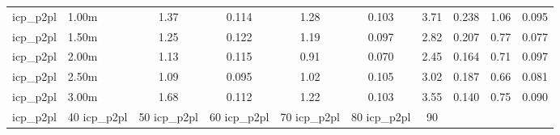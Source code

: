 \begin{tabular}{llcccccccc}
icp\_p2pl & 1.00m & 1.37 & 0.114 & 1.28 & 0.103 & 3.71 & 0.238 & 1.06 & 0.095 \\
icp\_p2pl & 1.50m & 1.25 & 0.122 & 1.19 & 0.097 & 2.82 & 0.207 & 0.77 & 0.077 \\
icp\_p2pl & 2.00m & 1.13 & 0.115 & 0.91 & 0.070 & 2.45 & 0.164 & 0.71 & 0.097 \\
icp\_p2pl & 2.50m & 1.09 & 0.095 & 1.02 & 0.105 & 3.02 & 0.187 & 0.66 & 0.081 \\
icp\_p2pl & 3.00m & 1.68 & 0.112 & 1.22 & 0.103 & 3.55 & 0.140 & 0.75 & 0.090 \\
icp\_p2pl & 40%
icp\_p2pl & 50%
icp\_p2pl & 60%
icp\_p2pl & 70%
icp\_p2pl & 80%
icp\_p2pl & 90%
\bottomrule
\end{tabular}
